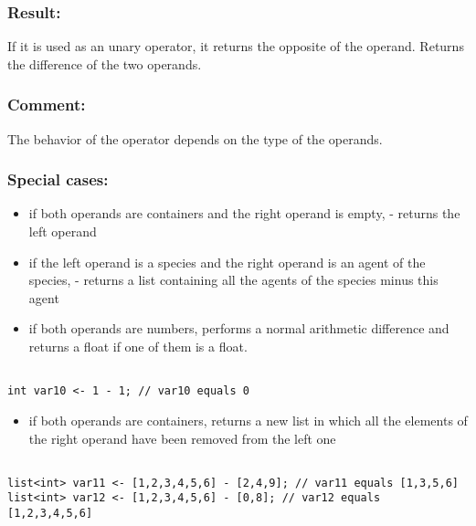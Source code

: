 \documentclass[]{book}
\providecommand{\tightlist}{%
  \setlength{\itemsep}{0pt}\setlength{\parskip}{0pt}}
\theoremstyle{definition}
\theoremstyle{definition}
\theoremstyle{definition}
\theoremstyle{remark}
\begin{document}
\subsubsection{Result:}\label{result}

If it is used as an unary operator, it returns the opposite of the
operand. Returns the difference of the two operands.

\subsubsection{Comment:}\label{comment}

The behavior of the operator depends on the type of the operands.

\subsubsection{Special cases:}\label{special-cases}

\begin{itemize}
\tightlist
\item
  if both operands are containers and the right operand is empty, -
  returns the left operand\\
\item
  if the left operand is a species and the right operand is an agent of
  the species, - returns a list containing all the agents of the species
  minus this agent\\
\item
  if both operands are numbers, performs a normal arithmetic difference
  and returns a float if one of them is a float.
\end{itemize}

\begin{verbatim}
 
int var10 <- 1 - 1; // var10 equals 0
\end{verbatim}

\begin{itemize}
\tightlist
\item
  if both operands are containers, returns a new list in which all the
  elements of the right operand have been removed from the left one
\end{itemize}

\begin{verbatim}
 
list<int> var11 <- [1,2,3,4,5,6] - [2,4,9]; // var11 equals [1,3,5,6] 
list<int> var12 <- [1,2,3,4,5,6] - [0,8]; // var12 equals [1,2,3,4,5,6]
\end{verbatim}
\end{document}
